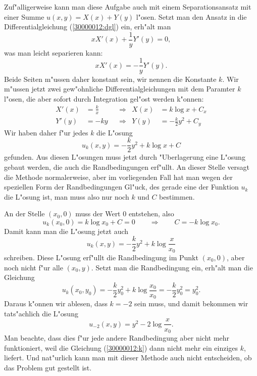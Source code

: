 \begin{diskussion}
Zuf"alligerweise kann man diese Aufgabe auch mit einem Separationsansatz
mit einer Summe $u(x,y)= X(x) + Y(y)$ l"osen.
Setzt man den Ansatz in die Differentialgleichung (\ref{30000012:dgl}) ein,
erh"alt man
\[
xX'(x) +\frac1yY'(y)=0,
\]
was man leicht separieren kann:
\[
xX'(x) = - \frac1yY'(y).
\]
Beide Seiten m"ussen daher konstant sein, wir nennen die Konstante $k$.
Wir m"ussen jetzt zwei gew"ohnliche Differentialgleichungen mit dem Paramter
$k$ l"osen, die aber sofort durch Integration gel"ost werden k"onnen:
\begin{align*}
X'(x)&=\frac{k}{x}&&\Rightarrow&X(x)&=k\log x + C_x      \\
Y'(y)&=-ky        &&\Rightarrow&Y(y)&=-\frac{k}2y^2 + C_y
\end{align*}
Wir haben daher f"ur jedes $k$ die L"osung
\[
u_k(x,y)=-\frac{k}2 y^2 + k\log x + C
\]
gefunden.
Aus diesen L"osungen muss jetzt durch "Uberlagerung eine L"osung 
gebaut werden, die auch die Randbedingungen erf"ullt.
An dieser Stelle versagt die Methode normalerweise, aber im vorliegenden
Fall hat man wegen der speziellen Form der Randbedingungen Gl"uck, des
gerade eine der Funktion $u_k$ die L"osung ist, man muss also
nur noch $k$ und $C$ bestimmen.

An der Stelle $(x_0,0)$ muss der Wert $0$ entstehen, also
\[
u_k(x_0,0) = k\log x_0 + C=0
\qquad\Rightarrow\qquad C=-k\log x_0.
\]
Damit kann man die L"osung jetzt auch
\[
u_k(x,y)=-\frac{k}{2}y^2 +k\log\frac{x}{x_0}
\]
schreiben.
Diese L"osung erf"ullt die Randbedingung im Punkt $(x_0,0)$, aber noch
nicht f"ur alle $(x_0,y)$.
Setzt man die Randbedingung ein, erh"alt man die Gleichung
\begin{equation}
u_k(x_0,y_0) = -\frac{k}{2}y_0^2 +k\log\frac{x_0}{x_0} = -\frac{k}{2}y_0^2=y_0^2.
\label{30000012:k}
\end{equation}
Daraus k"onnen wir ablesen, dass $k=-2$ sein muss, und damit bekommen
wir tats"achlich die L"osung
\[
u_{-2}(x,y)=y^2 -2\log\frac{x}{x_0}.
\]
Man beachte, dass dies f"ur jede andere Randbedingung aber nicht mehr
funktioniert, weil die Gleichung (\ref{30000012:k}) dann nicht mehr
ein einziges $k$, liefert.
Und nat"urlich kann man mit dieser Methode auch nicht entscheiden, ob
das Problem gut gestellt ist.


\end{diskussion}
